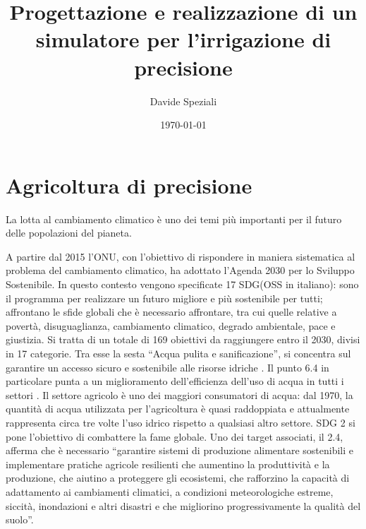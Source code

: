 \documentclass[12pt,a4paper,openright,twoside, openany]{book}
\title{Progettazione e realizzazione di un simulatore per l'irrigazione di precisione}
\author{Davide Speziali}
\date{\today}
\begin{document}
\frontmatter\frontispiece
%

%
\tableofcontents

\mainmatter
%
%
\chapter{Agricoltura di precisione}
%
La lotta al cambiamento climatico è uno dei temi più importanti per il futuro delle popolazioni del pianeta.

A partire dal 2015 l'\ac{ONU}, con l'obiettivo di rispondere in maniera sistematica al problema del cambiamento climatico, ha adottato l'Agenda 2030 per lo Sviluppo Sostenibile.
In questo contesto vengono specificate 17 \ac{SDG}(\ac{OSS} in italiano): sono il programma per realizzare un futuro migliore e più sostenibile per tutti; affrontano le sfide globali che è necessario affrontare, tra cui quelle relative a povertà, disuguaglianza, cambiamento climatico, degrado ambientale, pace e giustizia\cite{SDG-defininition}. Si tratta di un totale di 169 obiettivi da raggiungere entro il 2030, divisi in 17 categorie. Tra esse la sesta ``Acqua pulita e sanificazione'', si concentra sul garantire un accesso sicuro e sostenibile alle risorse idriche \cite{SDG-6}. Il punto 6.4 in particolare punta a un miglioramento dell'efficienza dell'uso di acqua in tutti i settori \cite{SDG-6-4-1,UN-WATER-WATER-USE-EFF-21}.
Il settore agricolo è uno dei maggiori consumatori di acqua: dal 1970, la quantità di acqua utilizzata per l'agricoltura è quasi raddoppiata e attualmente rappresenta circa tre volte l'uso idrico rispetto a qualsiasi altro settore\cite{FAO-AQUASTAT-2020}.
\ac{SDG} 2 si pone l'obiettivo di combattere la fame globale. Uno dei target associati, il 2.4, afferma che è necessario ``garantire sistemi di produzione alimentare sostenibili e implementare pratiche agricole resilienti che aumentino la produttività e la produzione, che aiutino a proteggere gli ecosistemi, che rafforzino la capacità di adattamento ai cambiamenti climatici, a condizioni meteorologiche estreme, siccità, inondazioni e altri disastri e che migliorino progressivamente la qualità del suolo''\cite{SDG-2.4}.
\end{document}

